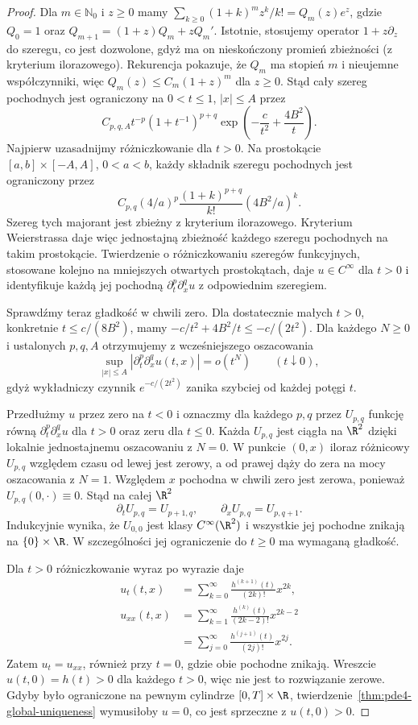 \begin{proof}
Dla $m\in\mathbb N_0$ i $z\geq0$ mamy
$\sum_{k\geq0}(1+k)^m z^k/k!=Q_m(z)e^z$,
gdzie $Q_0=1$ oraz
$Q_{m+1}=(1+z)Q_m+zQ_m'$.
Istotnie, stosujemy operator $1+z\partial_z$
do szeregu, co jest dozwolone, gdyż ma on
nieskończony promień zbieżności (z kryterium ilorazowego).
Rekurencja pokazuje, że $Q_m$ ma stopień $m$
i nieujemne współczynniki, więc
$Q_m(z)\leq C_m(1+z)^m$ dla $z\geq0$.
Stąd
cały szereg pochodnych jest ograniczony na
$0<t\le1$, $|x|\le A$ przez
\[
 C_{p,q,A}t^{-p}(1+t^{-1})^{p+q}
 \exp\left(-\frac c{t^2}+\frac{4B^2}{t}\right).
\]
Najpierw uzasadnijmy różniczkowanie dla $t>0$.
Na prostokącie $[a,b]\times[-A,A]$, $0<a<b$,
każdy składnik szeregu pochodnych jest ograniczony
przez
\[
 C_{p,q}(4/a)^p
 \frac{(1+k)^{p+q}}{k!}(4B^2/a)^k .
\]
Szereg tych majorant jest zbieżny z kryterium
ilorazowego. Kryterium Weierstrassa daje więc
jednostajną zbieżność każdego szeregu pochodnych
na takim prostokącie. Twierdzenie o różniczkowaniu
szeregów funkcyjnych, stosowane kolejno na mniejszych
otwartych prostokątach, daje $u\in C^\infty$
dla $t>0$ i identyfikuje każdą jej pochodną
$\partial_t^p\partial_x^q u$ z odpowiednim szeregiem.

Sprawdźmy teraz gładkość w chwili zero.
Dla dostatecznie małych $t>0$, konkretnie
$t\leq c/(8B^2)$, mamy
$-c/t^2+4B^2/t\leq-c/(2t^2)$.
Dla każdego $N\geq0$ i ustalonych $p,q,A$
otrzymujemy z wcześniejszego oszacowania
\[
 \sup_{|x|\leq A}|\partial_t^p\partial_x^q u(t,x)|
 =o(t^N)\qquad(t\downarrow0),
\]
gdyż wykładniczy czynnik $e^{-c/(2t^2)}$
zanika szybciej od każdej potęgi $t$.

Przedłużmy $u$ przez zero na $t<0$ i oznaczmy
dla każdego $p,q$ przez $U_{p,q}$ funkcję równą
$\partial_t^p\partial_x^q u$ dla $t>0$ oraz zeru
dla $t\leq0$. Każda $U_{p,q}$ jest ciągła
na $\R^2$ dzięki lokalnie jednostajnemu oszacowaniu
z $N=0$. W punkcie $(0,x)$ iloraz różnicowy
$U_{p,q}$ względem czasu od lewej jest zerowy,
a od prawej dąży do zera na mocy oszacowania
z $N=1$. Względem $x$ pochodna w chwili zero
jest zerowa, ponieważ $U_{p,q}(0,\cdot)\equiv0$.
Stąd na całej $\R^2$
\[
 \partial_tU_{p,q}=U_{p+1,q},\qquad
 \partial_xU_{p,q}=U_{p,q+1}.
\]
Indukcyjnie wynika, że $U_{0,0}$ jest klasy
$C^\infty(\R^2)$ i wszystkie jej pochodne
znikają na $\{0\}\times\R$.
W szczególności jej ograniczenie do $t\geq0$
ma wymaganą gładkość.

Dla $t>0$ różniczkowanie wyraz po wyrazie daje
\[
 \begin{aligned}
 u_t(t,x)&=\sum_{k=0}^\infty
     \frac{h^{(k+1)}(t)}{(2k)!}x^{2k},\\
 u_{xx}(t,x)&=\sum_{k=1}^\infty
     \frac{h^{(k)}(t)}{(2k-2)!}x^{2k-2}\\
 &=\sum_{j=0}^\infty\frac{h^{(j+1)}(t)}{(2j)!}x^{2j}.
 \end{aligned}
\]
Zatem $u_t=u_{xx}$, również przy $t=0$,
gdzie obie pochodne znikają.
Wreszcie $u(t,0)=h(t)>0$ dla każdego $t>0$,
więc nie jest to rozwiązanie zerowe.
Gdyby było ograniczone na pewnym cylindrze $[0,T]\times\R$,
twierdzenie~\ref{thm:pde4-global-uniqueness}
wymusiłoby $u=0$, co jest sprzeczne z $u(t,0)>0$.
\end{proof}

